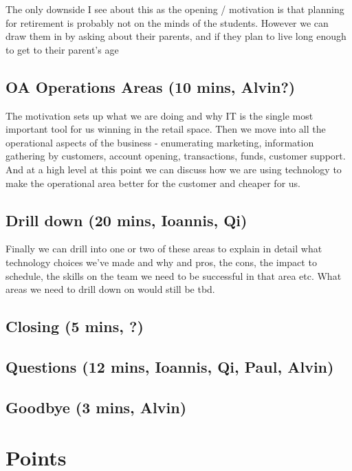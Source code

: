\documentclass{article}
\begin{document}
The only downside I see about this as the opening / motivation is that
planning for retirement is probably not on the minds of the students.
However we can draw them in by asking about their parents, and if they
plan to live long enough to get to their parent's age

\subsection{OA Operations Areas (10 mins, Alvin?)}
The motivation sets up what we are doing and why IT is the single most
important tool for us winning in the retail space.  Then we move into
all the operational aspects of the business - enumerating marketing,
information gathering by customers, account opening, transactions,
funds, customer support.  And at a high level at this point we can
discuss how we are using technology to make the operational area
better for the customer and cheaper for us.

\subsection{Drill down (20 mins, Ioannis, Qi)}
Finally we can drill into one or two of these areas to explain in
detail what technology choices we've made and why and pros, the cons,
the impact to schedule, the skills on the team we need to be
successful in that area etc.  What areas we need to drill down on
would still be tbd.

\subsection{Closing (5 mins, ?)}

\subsection{Questions (12 mins, Ioannis, Qi, Paul, Alvin)}

\subsection{Goodbye (3 mins, Alvin)}
 
\pagebreak

\section{Points}
\end{document}
